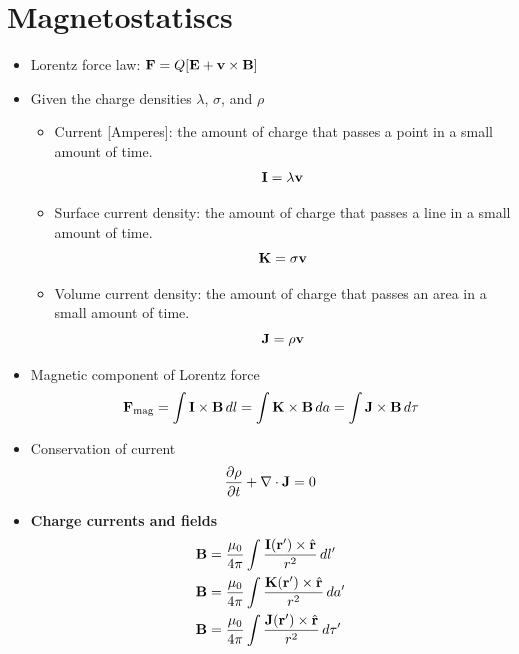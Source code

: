 \documentclass[oneside,a4paper,11pt]{report}
\begin{document}
\section{Magnetostatiscs}
\begin{itemize}

\item Lorentz force law: $\mathbf{F} = Q [\mathbf{E} + \mathbf{v} \times \mathbf{B} ]$

\item Given the charge densities $\lambda$, $\sigma$, and $\rho$
\begin{itemize}
\item Current [Amperes]: the amount of charge that passes a point in a small amount of time.
\begin{equation}
\mathbf{I} = \lambda \mathbf{v}
\end{equation}

\item Surface current density: the amount of charge that passes a line in a small amount of time.
\begin{equation}
\mathbf{K} = \sigma \mathbf{v}
\end{equation}

\item Volume current density: the amount of charge that passes an area in a small amount of time.
\begin{equation}
\mathbf{J} = \rho \mathbf{v}
\end{equation}
\end{itemize}

\item Magnetic component of Lorentz force
\begin{equation}
\mathbf{F}_{\text{mag}} = \int \mathbf{I} \times \mathbf{B} \, dl = \int \mathbf{K} \times \mathbf{B} \, da = \int \mathbf{J} \times \mathbf{B} \, d\tau
\end{equation}

\item Conservation of current
\begin{equation}
\frac{\partial \rho}{\partial t} + \nabla \cdot \mathbf{J} = 0
\end{equation}

\item \textbf{Charge currents and fields}
\begin{align}
\mathbf{B} &= \frac{\mu_0}{4\pi} \int \frac{\mathbf{I}(\mathbf{r}') \times \hat{\mathbf{r}}}{r^2}\, dl' \\
\mathbf{B} &= \frac{\mu_0}{4\pi} \int \frac{\mathbf{K}(\mathbf{r}') \times \hat{\mathbf{r}}}{r^2}\, da' \\
\mathbf{B} &= \frac{\mu_0}{4\pi} \int \frac{\mathbf{J}(\mathbf{r}') \times \hat{\mathbf{r}}}{r^2}\, d\tau' \label{eq:bfield_from_den}
\end{align}


\end{itemize}
\end{document}

